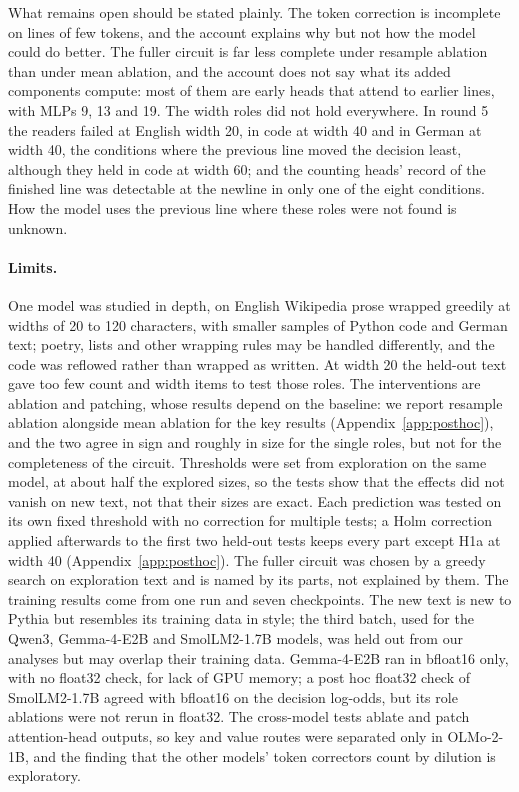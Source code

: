 \documentclass[11pt,a4paper]{article}
\begin{document}
What remains open should be stated plainly. The token correction is incomplete on lines of few tokens, and the account explains why but not how the model could do better. The fuller circuit is far less complete under resample ablation than under mean ablation, and the account does not say what its added components compute: most of them are early heads that attend to earlier lines, with MLPs 9, 13 and 19. The width roles did not hold everywhere. In round 5 the readers failed at English width 20, in code at width 40 and in German at width 40, the conditions where the previous line moved the decision least, although they held in code at width 60; and the counting heads' record of the finished line was detectable at the newline in only one of the eight conditions. How the model uses the previous line where these roles were not found is unknown.

\paragraph{Limits.}
One model was studied in depth, on English Wikipedia prose wrapped greedily at widths of 20 to 120 characters, with smaller samples of Python code and German text; poetry, lists and other wrapping rules may be handled differently, and the code was reflowed rather than wrapped as written. At width 20 the held-out text gave too few count and width items to test those roles. The interventions are ablation and patching, whose results depend on the baseline: we report resample ablation alongside mean ablation for the key results (Appendix~\ref{app:posthoc}), and the two agree in sign and roughly in size for the single roles, but not for the completeness of the circuit. Thresholds were set from exploration on the same model, at about half the explored sizes, so the tests show that the effects did not vanish on new text, not that their sizes are exact. Each prediction was tested on its own fixed threshold with no correction for multiple tests; a Holm correction applied afterwards to the first two held-out tests keeps every part except H1a at width 40 (Appendix~\ref{app:posthoc}). The fuller circuit was chosen by a greedy search on exploration text and is named by its parts, not explained by them. The training results come from one run and seven checkpoints. The new text is new to Pythia but resembles its training data in style; the third batch, used for the Qwen3, Gemma-4-E2B and SmolLM2-1.7B models, was held out from our analyses but may overlap their training data. Gemma-4-E2B ran in bfloat16 only, with no float32 check, for lack of GPU memory; a post hoc float32 check of SmolLM2-1.7B agreed with bfloat16 on the decision log-odds, but its role ablations were not rerun in float32. The cross-model tests ablate and patch attention-head outputs, so key and value routes were separated only in OLMo-2-1B, and the finding that the other models' token correctors count by dilution is exploratory.
\end{document}
